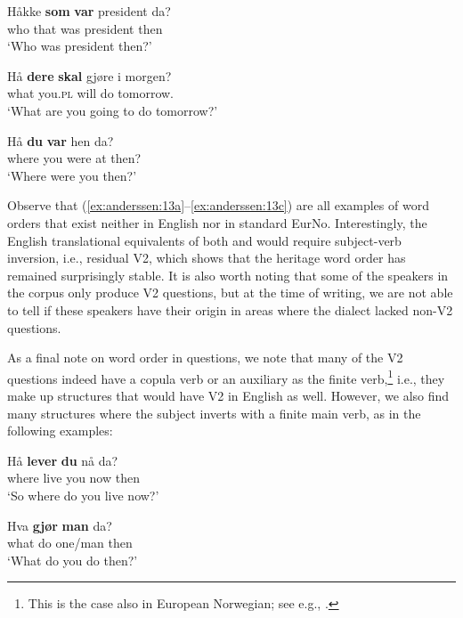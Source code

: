 \documentclass[output=paper]{langscibook}
\begin{document}
\ea%
    \ea \label{ex:anderssen:13a}
    \gll Håkke  \textbf{som} \textbf{var}   president da?\\
         who     that  was  president  then\\
	\glt     ‘Who was president then?’

	\ex \label{ex:anderssen:13b}
	\gll Hå     \textbf{dere}     \textbf{skal} gjøre {i morgen}?\\
	         what you.\textsc{pl} will do     tomorrow.\\
	\glt     ‘What are you going to do tomorrow?’

	\ex \label{ex:anderssen:13c}
	\gll Hå   \textbf{du}   \textbf{var}     hen da?\\
	where  you were  at    then?\\
	\glt ‘Where were you then?’
	\z
\z

Observe that (\ref{ex:anderssen:13a}--\ref{ex:anderssen:13c}) are all examples of word orders that exist neither in English nor in standard EurNo. Interestingly, the English translational equivalents of both  and  would require subject-verb inversion, i.e., residual V2, which shows that the heritage word order has remained surprisingly stable. It is also worth noting that some of the speakers in the corpus only produce V2 questions, but at the time of writing, we are not able to tell if these speakers have their origin in areas where the dialect lacked non-V2 questions.

As a final note on word order in questions, we note that many of the V2 questions indeed have a copula verb or an auxiliary as the finite verb,\footnote{This is the case also in European Norwegian; see e.g., \citet{Westergaard2016}.} i.e., they make up structures that would have V2 in English as well. However, we also find many structures where the subject inverts with a finite main verb, as in the following examples:

\ea%
    \label{ex:anderssen:14}
    \ea \label{ex:anderssen:14a}
	    \gll Hå     \textbf{lever} \textbf{du}   nå    da?\\
			where   live   you now then\\
	\glt ‘So where do you live now?’

	\ex \label{ex:anderssen:14b} 
		\gll Hva    \textbf{gjør} \textbf{man}         da?\\
			what  do     one/man  then\\
	\glt ‘What do you do then?’
	\z
\z
\end{document}
